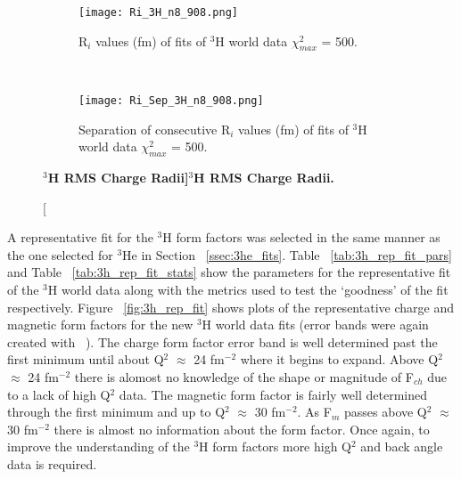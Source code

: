 \begin{figure}[!ht]
\begin{subfigure}{1.\textwidth}
  \centering
  \texttt{[image: Ri\_3H\_n8\_908.png]}
  \caption{R$_i$ values (fm) of fits of $^3$H world data $\chi^2_{max}$ = 500.}
  \label{fig:3h_ri_ind}
\end{subfigure}\\
\begin{subfigure}{1.\textwidth}
  \centering
  \texttt{[image: Ri\_Sep\_3H\_n8\_908.png]}
  \caption{Separation of consecutive R$_i$ values (fm) of fits of $^3$H world data $\chi^2_{max}$ = 500.}
  \label{fig:3h_ri_sep}
\end{subfigure}
\caption[\bf{$^3$H RMS Charge Radii}]{\bf{$^3$H RMS Charge Radii.}}
\label{fig:3h_ri}
\end{figure}

A representative fit for the $^3$H form factors was selected in the same manner as the one selected for $^3$He in Section ~\ref{ssec:3he_fits}. Table ~\ref{tab:3h_rep_fit_pars} and Table ~\ref{tab:3h_rep_fit_stats} show the parameters for the representative fit of the $^3$H world data along with the metrics used to test the `goodness' of the fit respectively. Figure ~\ref{fig:3h_rep_fit} shows plots of the representative charge and magnetic form factors for the new $^3$H world data fits (error bands were again created with ~\cite{web_plot_digitizer}). The charge form factor error band is well determined past the first minimum until about Q$^2$ $\approx$ 24 fm$^{-2}$ where it begins to expand. Above Q$^2$ $\approx$ 24 fm$^{-2}$ there is alomost no knowledge of the shape or magnitude of F$_{ch}$ due to a lack of high Q$^2$ data. The magnetic form factor is fairly well determined through the first minimum and up to Q$^2$ $\approx$ 30 fm$^{-2}$. As F$_m$ passes above Q$^2$ $\approx$ 30 fm$^{-2}$ there is almost no information about the form factor. Once again, to improve the understanding of the $^3$H form factors more high Q$^2$ and back angle data is required.

